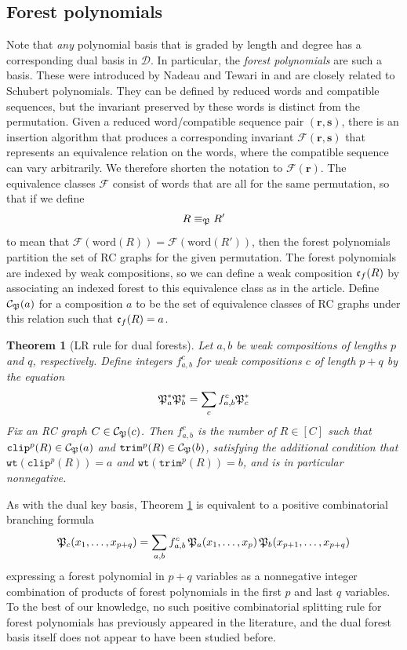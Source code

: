 \documentclass{amsart}
\newtheorem{theorem}{Theorem}[section]
\theoremstyle{definition}
\theoremstyle{remark}
\numberwithin{equation}{subsection}
\newcommand{\wtt}{\mathtt{wt}}
\newcommand{\trm}{\mathtt{trim}}
\newcommand{\clp}{\mathtt{clip}}
\newcommand{\dcoma}{\mathcal{D}}
\begin{document}
\subsection*{Forest polynomials}

Note that \emph{any} polynomial basis that is graded by length and degree has a corresponding dual basis in $\dcoma$. In particular, the \emph{forest polynomials} are such a basis. These were introduced by Nadeau and Tewari in \cite{nadeau2024forest} and are closely related to Schubert polynomials. They can be defined by reduced words and compatible sequences, but the invariant preserved by these words is distinct from the permutation. Given a reduced word/compatible sequence pair $(\mathbf{r},\mathbf{s})$, there is an insertion algorithm that produces a corresponding invariant $\mathcal{F}(\mathbf{r},\mathbf{s})$ that represents an equivalence relation on the words, where the compatible sequence can vary arbitrarily. We therefore shorten the notation to $\mathcal{F}(\mathbf{r})$. The equivalence classes $\mathcal{F}$ consist of words that are all for the same permutation, so that if we define
$$R\equiv_{\mathfrak{P}} R'$$
to mean that $\mathcal{F}(\mathrm{word}(R)) = \mathcal{F}(\mathrm{word}(R'))$, then the forest polynomials partition the set of RC graphs for the given permutation. The forest polynomials are indexed by weak compositions, so we can define a weak composition $\mathfrak{c}_f(R)$ by associating an indexed forest to this equivalence class as in the article. Define $\mathcal{C}_{\mathfrak{P}}(a)$ for a composition $a$ to be the set of equivalence classes of RC graphs under this relation such that $\mathfrak{c}_f(R)=a$.




\begin{theorem}[LR rule for dual forests]\label{theorem:LRforest}
Let $a,b$ be weak compositions of lengths $p$ and $q$, respectively. Define integers $f_{a,b}^c$ for weak compositions $c$ of length $p+q$ by the equation
$$\mathfrak{P}_a^*\mathfrak{P}_b^* = \sum_{c} f_{a,b}^c\mathfrak{P}_c^*$$
Fix an RC graph $C\in\mathcal{C}_{\mathfrak{P}}(c)$. Then $f_{a, b}^c$ is the number of $R\in[C]$ such that $\clp^p(R)\in \mathcal{C}_\forest(a)$ and $\trm^p(R)\in \mathcal{C}_\forest(b)$, satisfying the additional condition that $\wtt(\clp^p(R))=a$ and $\wtt(\trm^p(R))=b$, and is in particular nonnegative.
\end{theorem}

As with the dual key basis, Theorem \ref{theorem:LRforest} is equivalent to a positive combinatorial branching formula
$$\mathfrak{P}_c(x_1,\ldots,x_{p+q}) = \sum_{a,b} f_{a,b}^c\,\mathfrak{P}_a(x_1,\ldots,x_p)\,\mathfrak{P}_b(x_{p+1},\ldots,x_{p+q})$$
expressing a forest polynomial in $p+q$ variables as a nonnegative integer combination of products of forest polynomials in the first $p$ and last $q$ variables. To the best of our knowledge, no such positive combinatorial splitting rule for forest polynomials has previously appeared in the literature, and the dual forest basis itself does not appear to have been studied before.
\end{document}
